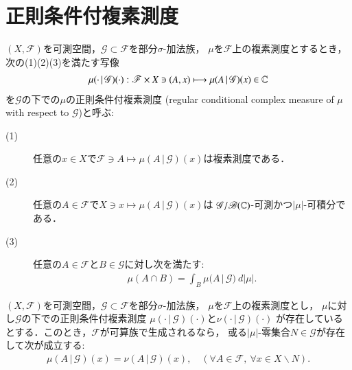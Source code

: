 \section{正則条件付複素測度}
	\begin{screen}
		\begin{dfn}[正則条件付複素測度]
			$(X,\mathscr{F})$を可測空間，$\mathscr{G} \subset \mathscr{F}$を部分$\sigma$-加法族，
			$\mu$を$\mathscr{F}$上の複素測度とするとき，次の(1)(2)(3)を満たす写像
			\begin{align}
				\mu(\cdot\, |\, \mathscr{G})(\cdot):
				\mathscr{F} \times X \ni (A,x) \longmapsto \mu(A\, |\, \mathscr{G})(x) \in \mathbb{C}
			\end{align}
			を$\mathscr{G}$の下での$\mu$の正則条件付複素測度
			(regular conditional complex measure of $\mu$ with respect to $\mathscr{G}$)と呼ぶ:
			\begin{description}
				\item[(1)] 任意の$x \in X$で$\mathscr{F} \ni A \longmapsto \mu(A\, |\, \mathscr{G})(x)$は複素測度である．
				\item[(2)] 任意の$A \in \mathscr{F}$で$X \ni x \longmapsto \mu(A\, |\, \mathscr{G})(x)$は
					$\mathscr{G}/\mathscr{B}(\mathbb{C})$-可測かつ$|\mu|$-可積分である．
				\item[(3)] 任意の$A \in \mathscr{F}$と$B \in \mathscr{G}$に対し次を満たす:
					\begin{align}
						\mu(A \cap B) = \int_B \mu(A\, |\, \mathscr{G})\ d|\mu|.
					\end{align}
			\end{description}
		\end{dfn}
	\end{screen}
	
	\begin{screen}
		\begin{thm}[正則条件付複素測度の一意性]
			$(X,\mathscr{F})$を可測空間，$\mathscr{G} \subset \mathscr{F}$を部分$\sigma$-加法族，
			$\mu$を$\mathscr{F}$上の複素測度とし，
			$\mu$に対し$\mathscr{G}$の下での正則条件付複素測度
			$\mu(\cdot\, |\, \mathscr{G})(\cdot)$と$\nu(\cdot\, |\, \mathscr{G})(\cdot)$
			が存在しているとする．このとき，$\mathscr{F}$が可算族で生成されるなら，
			或る$|\mu|$-零集合$N \in \mathscr{G}$が存在して次が成立する:
			\begin{align}
				\mu(A\, |\, \mathscr{G})(x) = \nu(A\, |\, \mathscr{G})(x),
				\quad (\forall A \in \mathscr{F},\ \forall x \in X \backslash N).
			\end{align}
		\end{thm}
	\end{screen}
	
